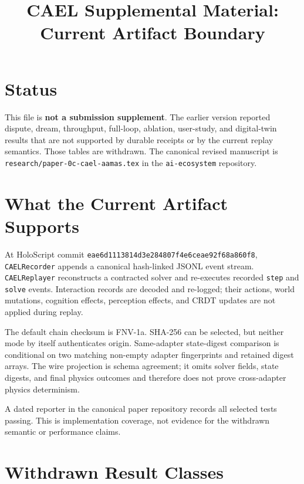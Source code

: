 \documentclass[sigconf,nonacm]{acmart}
\begin{document}
\title{CAEL Supplemental Material: Current Artifact Boundary}
\maketitle

\section{Status}

This file is \textbf{not a submission supplement}.  The earlier version
reported dispute, dream, throughput, full-loop, ablation, user-study, and
digital-twin results that are not supported by durable receipts or by the
current replay semantics.  Those tables are withdrawn.  The canonical revised
manuscript is \texttt{research/paper-0c-cael-aamas.tex} in the
\texttt{ai-ecosystem} repository.

\section{What the Current Artifact Supports}

At HoloScript commit
\texttt{eae6d1113814d3e284807f4e6ceae92f68a860f8},
\texttt{CAELRecorder} appends a canonical hash-linked JSONL event stream.
\texttt{CAELReplayer} reconstructs a contracted solver and re-executes recorded
\texttt{step} and \texttt{solve} events.  Interaction records are decoded and
re-logged; their actions, world mutations, cognition effects, perception
effects, and CRDT updates are not applied during replay.

The default chain checksum is FNV-1a.  SHA-256 can be selected, but neither mode
by itself authenticates origin.  Same-adapter state-digest comparison is
conditional on two matching non-empty adapter fingerprints and retained digest
arrays.  The wire projection is schema agreement; it omits solver fields, state
digests, and final physics outcomes and therefore does not prove cross-adapter
physics determinism.

A dated reporter in the canonical paper repository records all selected tests
passing.  This is implementation coverage, not evidence for the withdrawn
semantic or performance claims.

\section{Withdrawn Result Classes}
\end{document}
